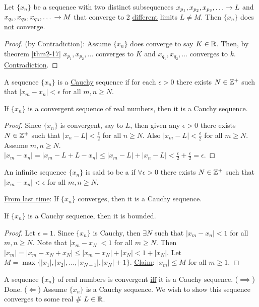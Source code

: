 \documentclass[]{article}
\begin{document}
\begin{theorem}
	Let $\{x_n\}$ be a sequence with two distinct subsequences $x_{p_1},x_{p_2},x_{p_3},\dots \ra L$ and $x_{q_1},x_{q_2},x_{q_3},\dots \\\rightarrow M$ that converge to 2 \ul{different} limits $L\neq M$. Then $\{x_n\}$ does \ul{not} converge.
\end{theorem}
\begin{proof}
	(by Contradiction): Assume $\{x_n\}$ does converge to say $K\in\mathbb{R}$. Then, by theorem \ref{thm2-17} $x_{p_1},x_{p_2},\dots$ converges to $K$ and $x_{q_1},x_{q_2},\dots$ converges to $k$. \ul{Contradiction}.
\end{proof}

\begin{definition}
	A sequence $\{x_n\}$ is a \ul{Cauchy} sequence if for each $\epsilon>0$ there exists $N\in\mathbb{Z}^+$ such that $|x_m-x_n|<\epsilon$ for all $m,n\geq N$.
\end{definition}
\begin{theorem}
	If $\{x_n\}$ is a convergent sequence of real numbers, then it is a Cauchy sequence.
\end{theorem}
\begin{proof}
	Since $\{x_n\}$ is convergent, say to $L$, then given any $\epsilon>0$ there exists $N\in\mathbb{Z}^+$ such that $|x_n - L|<\frac{\epsilon}{2}$ for all $n\geq N$. Also $|x_m-L|<\frac{\epsilon}{2}$ for all $m\geq N$. 
	Assume $m,n\geq N$. $|x_m - x_n| = |x_m-L + L - x_n| \leq |x_m-L| + |x_n-L| < \frac{\epsilon}{2} + \frac{\epsilon}{2} = \epsilon$.
\end{proof}
\begin{recall}
	An infinite sequence $\{x_n\}$ is said to be a  if $\forall \epsilon>0$ there exists $N\in\mathbb{Z}^+$ such that $|x_m-x_n|<\epsilon$ for all $m,n\geq N$.
\end{recall}
\ul{From last time}: If $\{x_n\}$ converges, then it is a Cauchy sequence.
\begin{lemma}
	If $\{x_n\}$ is a Cauchy sequence, then it is bounded.
\end{lemma}
\begin{proof}
	Let $\epsilon=1$. Since $\{x_n\}$ is Cauchy, then $\exists N$ such that $|x_m-x_n|<1$ for all $m,n\geq N$.
	Note that $|x_m-x_N|<1$ for all $m\geq N$. Then $|x_m| = |x_m-x_N+x_N| \leq |x_m-x_N| + |x_N| < 1+ |x_N|$. Let $M = \max{\{|x_1|,|x_2|,\dots,|x_{N-1}|,|x_N|+1\}}$. \ul{Claim}: $|x_m|\leq M$ for all $m\geq 1$.
\end{proof}
\begin{theorem}
	A sequence $\{x_n\}$ of real numbers is convergent \ul{iff} it is a Cauchy sequence. ($\implies$) Done.
	($\Longleftarrow$) Assume $\{x_n\}$ is a Cauchy sequence. We wish to show this sequence converges to some real \# $L\in\mathbb{R}$.
\end{theorem}
\end{document}

